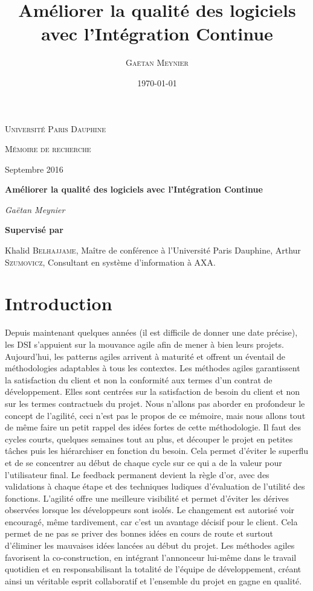 \documentclass{report}
\title{Améliorer la qualité des logiciels avec l'Intégration Continue}
\author{\textsc{Gaëtan Meynier}}
\date{\today}
\begin{document}
  \begin{titlepage}
    \centering
    {\scshape\LARGE Université Paris Dauphine \par}
    \vspace{1cm}
	  {\scshape\Large Mémoire de recherche\par}
    \vspace{0.5cm}
    Septembre 2016\par
    \vspace{4.5cm}
    {\huge\bfseries Améliorer la qualité des logiciels avec l'Intégration Continue\par}
    \vspace{2cm}
	  {\Large\itshape Gaëtan Meynier\par}
    \vspace{5cm}
	  \vfill
	    {\bfseries Supervisé par\par}
      \vspace{0.5cm}
	    Khalid \textsc{Belhajjame}, Maître de conférence à l'Université Paris Dauphine,
      Arthur \textsc{Szumovicz}, Consultant en système d'information à AXA.
	  \vfill
  \end{titlepage}

  \tableofcontents                %

  \chapter{Introduction}
  Depuis maintenant quelques années (il est difficile de donner une date précise), les DSI s’appuient sur la mouvance agile afin de mener à bien leurs projets. Aujourd’hui, les patterns agiles arrivent à maturité et offrent un éventail de méthodologies adaptables à tous les contextes. Les méthodes agiles garantissent la satisfaction du client et non la conformité aux termes d’un contrat de développement. Elles sont centrées sur la satisfaction de besoin du client et non sur les termes contractuels du projet. Nous n’allons pas aborder en profondeur le concept de l’agilité, ceci n’est pas le propos de ce mémoire, mais nous allons tout de même faire un petit rappel des idées fortes de cette méthodologie. Il faut des cycles courts, quelques semaines tout au plus, et découper le projet en petites tâches puis les hiérarchiser en fonction du besoin. Cela permet d’éviter le superflu et de se concentrer au début de chaque cycle sur ce qui a de la valeur pour l’utilisateur final. Le feedback permanent devient la règle d’or, avec des validations à chaque étape et des techniques ludiques d’évaluation de l’utilité des fonctions. L’agilité offre une meilleure visibilité et permet d’éviter les dérives observées lorsque les développeurs sont isolés. Le changement est autorisé voir encouragé, même tardivement,  car c’est un avantage décisif pour le client. Cela permet de ne pas se priver des bonnes idées en cours de route et surtout d’éliminer les mauvaises idées lancées au début du projet. Les méthodes agiles favorisent la co-construction, en intégrant l’annonceur lui-même dans le travail quotidien et en responsabilisant la totalité de l’équipe de développement, créant ainsi un véritable esprit collaboratif et l’ensemble du projet en gagne en qualité.\\
\end{document}
